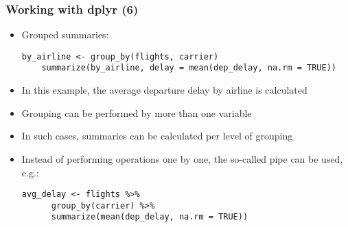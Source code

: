 \documentclass[10pt]{beamer}
\theoremstyle{definition}
\begin{document}
\begin{frame}[fragile]
\frametitle{Working with \textbf{dplyr} (6)}
\begin{itemize}
	\item Grouped summaries:
	\begin{lstlisting}[style = rstyle, breaklines]
	by_airline <- group_by(flights, carrier)
	summarize(by_airline, delay = mean(dep_delay, na.rm = TRUE))	
	\end{lstlisting}
	\item In this example, the average departure delay by airline is calculated
	\item Grouping can be performed by more than one variable
	\item In such cases, summaries can be calculated per level of grouping
	\item Instead of performing operations one by one, the so-called pipe can be used, e.g.:
	\begin{lstlisting}[style = rstyle, breaklines]
	avg_delay <- flights %>% 
	  group_by(carrier) %>%
	  summarize(mean(dep_delay, na.rm = TRUE))	
	\end{lstlisting}
\end{itemize}
\end{frame}
\end{document}

